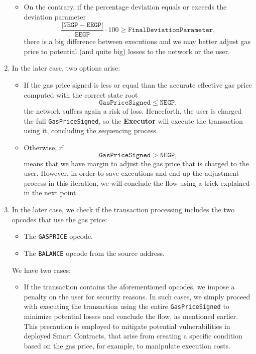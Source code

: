 \begin{enumerate}
\begin{itemize}
\item On the contrary, if the percentage deviation equals or exceeds the deviation parameter
\[
\frac{\vert \texttt{NEGP} - \texttt{EEGP} \vert}{\texttt{EEGP}} \cdot 100 \geq \texttt{FinalDeviationParameter},
\]
there is a big difference between executions and we may better adjust gas price to potential (and quite big) losses to the network or the user.


\end{itemize}

\item In the later case, two options arise:

\begin{itemize}

\item If the gas price signed is less or equal than the accurate effective gas price computed with the correct state root
\[
\texttt{GasPriceSigned} \leq \texttt{NEGP},
\]
the network suffers again a risk of loss. Henceforth, the user is charged the full \texttt{GasPriceSigned}, so the \textbf{Executor} will execute the transaction using it, concluding the sequencing process.

\item Otherwise, if
\[
\texttt{GasPriceSigned} > \texttt{NEGP},
\]
means that we have margin to adjust the gas price that is charged to the user. However, in order to save executions and end up the adjustment process in this iteration, we will conclude the flow using a trick explained in the next point.

\end{itemize}

\item In the later case, we check if the transaction processing includes the two opcodes that use the gas price:

\begin{itemize}[-]

\item The \texttt{GASPRICE} opcode.

\item The \texttt{BALANCE} opcode from the source address.

\end{itemize}

We have two cases:

\begin{itemize}

\item If the transaction contains the aforementioned opcodes, we impose a penalty on the user for security reasons. In such cases, we simply proceed with executing the transaction using the entire \texttt{GasPriceSigned} to minimize potential losses and conclude the flow, as mentioned earlier. This precaution is employed to mitigate potential vulnerabilities in deployed Smart Contracts, that arise from creating a specific condition based on the gas price, for example, to manipulate execution costs.


\end{itemize}
\end{enumerate}
